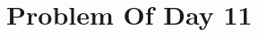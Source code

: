 \documentclass{article}
\newcommand{\YearPath}{../../../LatexConfig} %
\newcommand{\SemesterPath}{../../LatexConfig} %
\newcommand{\ClassPath}{../LatexConfig} %
\begin{document}




\section{Problem Of Day 11}

\end{document}
